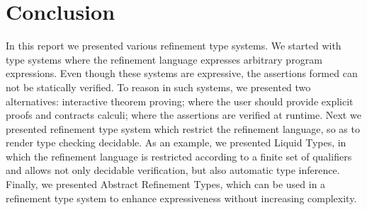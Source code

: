 \section{Conclusion}
In this report we presented various refinement type systems.
We started with type systems where the refinement language expresses arbitrary program expressions.
Even though these systems are expressive, the assertions formed can not be statically
verified. 
%
To reason in such systems, we presented two alternatives:
interactive theorem proving; where 
the user should provide explicit proofs and 
contracts calculi; where 
the assertions are verified at runtime.
%
Next we presented refinement type system 
which restrict the refinement language, 
so as to render type checking decidable.
As an example, we presented Liquid Types, in which 
the refinement language is restricted according to a finite set of qualifiers
and allows not only decidable verification, but also automatic type inference.
Finally, we presented Abstract Refinement Types, which can be used
in a refinement type system to enhance expressiveness without increasing complexity.